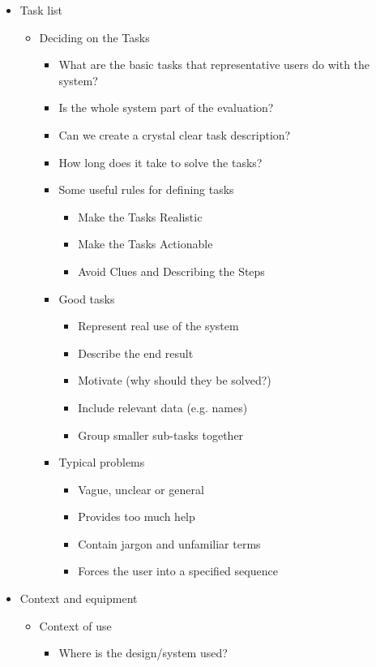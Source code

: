 \begin{itemize}
\begin{itemize}
		\item Task list
		\begin{itemize}
			\item Deciding on the Tasks
			\begin{itemize}
				\item What are the basic tasks that representative users do with the system?
				\item Is the whole system part of the evaluation?
				\item Can we create a crystal clear task description?
				\item How long does it take to solve the tasks?
				\item Some useful rules for defining tasks
				\begin{itemize}
					\item Make the Tasks Realistic
					\item Make the Tasks Actionable
					\item Avoid Clues and Describing the Steps
				\end{itemize}
				\item Good tasks
				\begin{itemize}
					\item Represent real use of the system
					\item Describe the end result
					\item Motivate (why should they be solved?)
					\item Include relevant data (e.g. names)
					\item Group smaller sub-tasks together
				\end{itemize}
				\item Typical problems
				\begin{itemize}
					\item Vague, unclear or general
					\item Provides too much help
					\item Contain jargon and unfamiliar terms
					\item Forces the user into a specified sequence
				\end{itemize}
			\end{itemize}
		\end{itemize}
		\item Context and equipment
		\begin{itemize}
			\item Context of use
			\begin{itemize}
				\item Where is the design/system used?

\end{itemize}
\end{itemize}
\end{itemize}
\end{itemize}
